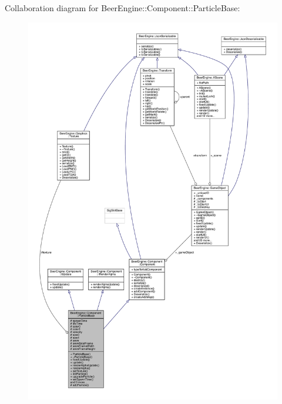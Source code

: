 Collaboration diagram for Beer\+Engine\+:\+:Component\+:\+:Particle\+Base\+:
\nopagebreak
\begin{figure}[H]
\begin{center}
\leavevmode
\includegraphics[width=350pt]{class_beer_engine_1_1_component_1_1_particle_base__coll__graph}
\end{center}
\end{figure}

